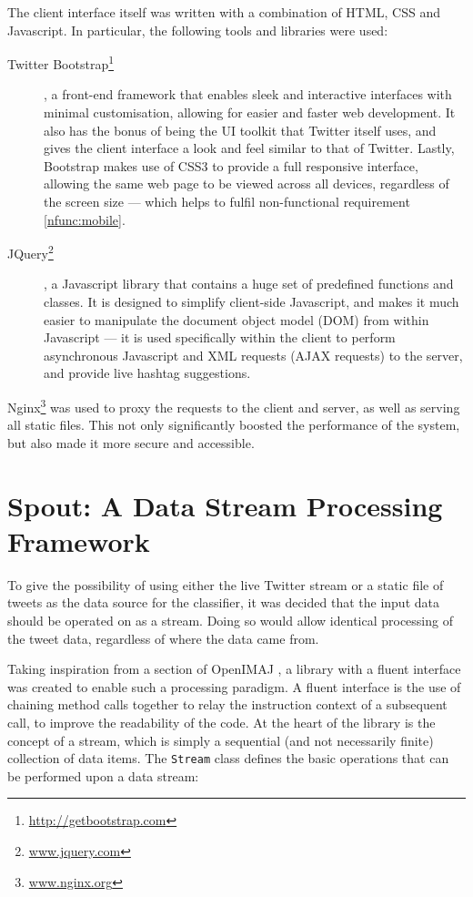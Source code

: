 \documentclass[11pt,a4paper]{report}
\begin{document}
The client interface itself was written with a combination of HTML, CSS and Javascript. In particular, the following tools and libraries were used:

\begin{description}
    \item[Twitter Bootstrap\footnote{\url{http://getbootstrap.com}}], a front-end framework that enables sleek and interactive interfaces with minimal customisation, allowing for easier and faster web development. It also has the bonus of being the UI toolkit that Twitter itself uses, and gives the client interface a look and feel similar to that of Twitter. Lastly, Bootstrap makes use of CSS3 to provide a full responsive interface, allowing the same web page to be viewed across all devices, regardless of the screen size --- which helps to fulfil non-functional requirement \ref{nfunc:mobile}.
    \item[JQuery\footnote{\url{www.jquery.com}}], a Javascript library that contains a huge set of predefined functions and classes. It is designed to simplify client-side Javascript, and makes it much easier to manipulate the document object model (DOM) from within Javascript --- it is used specifically within the client to perform asynchronous Javascript and XML requests (AJAX requests) to the server, and provide live hashtag suggestions.
\end{description}

Nginx\footnote{\url{www.nginx.org}} was used to proxy the requests to the client and server, as well as serving all static files. This not only significantly boosted the performance of the system, but also made it more secure and accessible.

\section{Spout: A Data Stream Processing Framework}
\label{sec:spout}
To give the possibility of using either the live Twitter stream or a static file of tweets as the data source for the classifier, it was decided that the input data should be operated on as a stream. Doing so would allow identical processing of the tweet data, regardless of where the data came from.

Taking inspiration from a section of OpenIMAJ \parencite{Hare:2011}, a library with a fluent interface was created to enable such a processing paradigm. A fluent interface is the use of chaining method calls together to relay the instruction context of a subsequent call, to improve the readability of the code. At the heart of the library is the concept of a stream, which is simply a sequential (and not necessarily finite) collection of data items. The \verb+Stream+ class defines the basic operations that can be performed upon a data stream:
\end{document}
